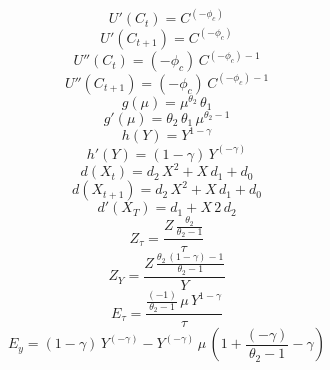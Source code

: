 \begin{dmath*}
{U'(C_t)} = {{C}}^{\left(-{{\phi_c}}\right)}
\end{dmath*}
\begin{dmath*}
{U'(C_{t+1})} = {{C}}^{\left(-{{\phi_c}}\right)}
\end{dmath*}
\begin{dmath*}
{U''(C_t)} = \left(-{{\phi_c}}\right)\, {{C}}^{\left(-{{\phi_c}}\right)-1}
\end{dmath*}
\begin{dmath*}
{U''(C_{t+1})} = \left(-{{\phi_c}}\right)\, {{C}}^{\left(-{{\phi_c}}\right)-1}
\end{dmath*}
\begin{dmath*}
g(\mu) = {{\mu}}^{{{\theta_2}}}\, {{\theta_1}}
\end{dmath*}
\begin{dmath*}
g'(\mu) = {{\theta_2}}\, {{\theta_1}}\, {{\mu}}^{{{\theta_2}}-1}
\end{dmath*}
\begin{dmath*}
{h(Y)} = {{Y}}^{1-{{\gamma}}}
\end{dmath*}
\begin{dmath*}
{h'(Y)} = \left(1-{{\gamma}}\right)\, {{Y}}^{\left(-{{\gamma}}\right)}
\end{dmath*}
\begin{dmath*}
{d(X_t)} = {{d_2}}\, {{X}}^{2}+{{X}}\, {{d_1}}+{{d_0}}
\end{dmath*}
\begin{dmath*}
{d(X_{t+1})} = {{d_2}}\, {{X}}^{2}+{{X}}\, {{d_1}}+{{d_0}}
\end{dmath*}
\begin{dmath*}
{d'(X_T)} = {{d_1}}+{{X}}\, 2\, {{d_2}}
\end{dmath*}
\begin{dmath*}
{Z_\tau} = \frac{{{Z}}\, \frac{{{\theta_2}}}{{{\theta_2}}-1}}{{{\tau}}}
\end{dmath*}
\begin{dmath*}
{Z_Y} = \frac{{{Z}}\, \frac{{{\theta_2}}\, \left(1-{{\gamma}}\right)-1}{{{\theta_2}}-1}}{{{Y}}}
\end{dmath*}
\begin{dmath*}
{E_\tau} = \frac{\frac{\left(-1\right)}{{{\theta_2}}-1}\, {{\mu}}\, {{Y}}^{1-{{\gamma}}}}{{{\tau}}}
\end{dmath*}
\begin{dmath*}
{E_y} = \left(1-{{\gamma}}\right)\, {{Y}}^{\left(-{{\gamma}}\right)}-{{Y}}^{\left(-{{\gamma}}\right)}\, {{\mu}}\, \left(1+\frac{\left(-{{\gamma}}\right)}{{{\theta_2}}-1}-{{\gamma}}\right)
\end{dmath*}
